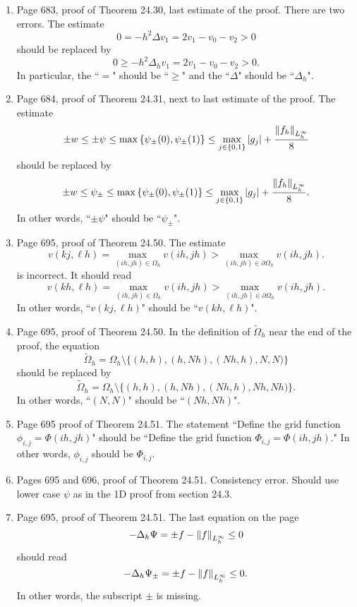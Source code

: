 \documentclass{book}
\begin{document}
	\begin{enumerate}
	
	\item
Page 683, proof of Theorem 24.30, last estimate of the proof. There are two errors. The estimate
	\[
0 = - h^2 \Delta v_1 = 2v_1 - v_0 - v_2 > 0	
	\]
should be replaced by
	\[
0 \ge  - h^2 \Delta_h v_1 = 2v_1 - v_0 - v_2 > 0	.
	\]
In particular, the ``$=$" should be ``$\ge$" and the ``$\Delta$" should be ``$\Delta_h$".

	\item
Page 684, proof of Theorem 24.31, next to last estimate of the proof. The estimate
	\[
\pm w \le \pm \psi \le \max\left\{ \psi_\pm(0) , \psi_\pm(1) \right\} \le 	\max_{j\in \{0,1\}} |g_j| + \frac{\left\| f_h \right\|_{L_h^\infty}}{8}
	\]
should be replaced by
	\[
\pm w \le \psi_\pm  \le \max\left\{ \psi_\pm(0) , \psi_\pm(1) \right\} \le 	\max_{j\in \{0,1\}} |g_j| + \frac{\left\| f_h \right\|_{L_h^\infty}}{8}.
	\]
In other words, ``$\pm \psi$" should be ``$\psi_\pm$".


	\item
Page 695, proof of Theorem 24.50. The estimate
	\[
v(k j,\ell h) = \max_{(ih,jh)\in \Omega_h} v(ih,jh) > \max_{(ih,jh)\in \partial\Omega_h} v(ih,jh)	.
	\]
is incorrect. It should read
	\[
v(k h,\ell h) = \max_{(ih,jh)\in \Omega_h} v(ih,jh) > \max_{(ih,jh)\in \partial\Omega_h} v(ih,jh)	.
	\]
In other words, ``$v(k j,\ell h)$" should be ``$v(k h,\ell h)$".


	\item
Page 695, proof of Theorem 24.50. In the definition of $\tilde{\Omega}_h$ near the end of the proof, the equation
	\[
\tilde{\Omega}_h = \Omega_h\setminus \{(h,h),(h,Nh), (Nh,h), N,N) \}	
	\]
should be replaced by 
	\[
\tilde{\Omega}_h = \Omega_h\setminus \{(h,h),(h,Nh), (Nh,h), Nh,Nh) \}	.
	\]
In other words, ``$(N,N)$" should be ``$(Nh,Nh)$".
	
	\item
	
	
Page 695 proof of Theorem 24.51. The statement ``Define the grid function $\phi_{i,j} = \Phi(ih,jh)$" should be ``Define the grid function $\Phi_{i,j} = \Phi(ih,jh)$." In other words, $\phi_{i,j}$ should be $\Phi_{i,j}$.
	
	
	
	\item
Pages 695 and 696, proof of Theorem 24.51. Consistency error. Should use lower case $\psi$ as in the 1D proof from section 24.3.

	\item
Page 695, proof of Theorem 24.51. The last equation on the page 
	\[
-\Delta_h \Psi = \pm f - \left\| f \right\|_{L_h^\infty} \le 0	
	\]
should read
	\[
-\Delta_h \Psi_{\pm} = \pm f - \left\| f \right\|_{L_h^\infty} \le 0.	
	\]
In other words, the subscript $\pm$ is missing.
	

\end{enumerate}
\end{document}
